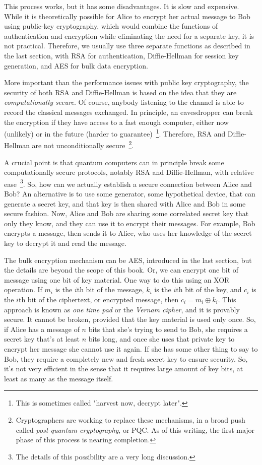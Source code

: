 This process works, but it has some disadvantages. It is slow and expensive. While it is theoretically possible for Alice to encrypt her actual message to Bob using public-key cryptography, which would combine the functions of authentication and encryption while eliminating the need for a separate key, it is not practical.  Therefore, we usually use three separate functions as described in the last section, with RSA for authentication, Diffie-Hellman for session key generation, and AES for bulk data encryption.

More important than the performance issues with public key cryptography, the security of both RSA and Diffie-Hellman is based on the idea that they are \emph{computationally secure}.  Of course, anybody listening to the channel is able to record the classical messages exchanged. In principle, an eavesdropper can break the encryption if they have access to a fast enough computer, either now (unlikely) or in the future (harder to guarantee)~\footnote{This is sometimes called "harvest now, decrypt later".}.  Therefore, RSA and Diffie-Hellman are not unconditionally secure~\footnote{Cryptographers are working to replace these mechanisms, in a broad push called \emph{post-quantum cryptography}, or PQC.  As of this writing, the first major phase of this process is nearing completion.}.

A crucial point is that quantum computers can in principle break some computationally secure protocols, notably RSA and Diffie-Hellman, with relative ease~\footnote{The details of this possibility are a very long discussion.}. So, how can we actually establish a secure connection between Alice and Bob? An alternative is to use some generator, some hypothetical device, that can generate a secret key, and that key is then shared with Alice and Bob in some secure fashion. Now, Alice and Bob are sharing some correlated secret key that only they know, and they can use it to encrypt their messages. For example, Bob encrypts a message, then sends it to Alice, who uses her knowledge of the secret key to decrypt it and read the message.

The bulk encryption mechanism can be AES, introduced in the last section, but the details are beyond the scope of this book. Or, we can encrypt one bit of message using one bit of key material.  One way to do this using an XOR operation.  If $m_i$ is the $i$th bit of the message, $k_i$ is the $i$th bit of the key, and $c_i$ is the $i$th bit of the ciphertext, or encrypted message, then $c_i = m_i \oplus k_i$.  This approach is known as \emph{one time pad} or the \emph{Vernam cipher}, and it is provably secure. It cannot be broken, provided that the key material is used only once. So, if Alice has a message of $n$ bits that she's trying to send to Bob, she requires a secret key that's at least $n$ bits long, and once she uses that private key to encrypt her message she cannot use it again. If she has some other thing to say to Bob, they require a completely new and fresh secret key to ensure security. So, it's not very efficient in the sense that it requires large amount of key bits, at least as many as the message itself.

